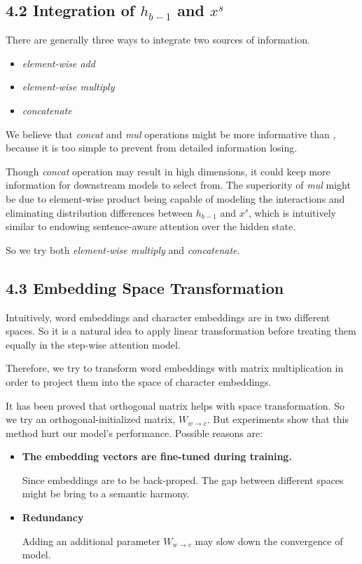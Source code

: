 \documentclass[letterpaper]{article} %
\begin{document}
\subsection{4.2 Integration of $h_{b-1}$ and $x^s$}
There are generally three ways to integrate two sources of information.
\begin{itemize}
    \item \textit{element-wise add}
    \item \textit{element-wise multiply}
    \item \textit{concatenate}
\end{itemize}


We believe that \textit{concat} and \textit{mul} operations might be more informative than , because it is too simple to prevent from detailed information losing. 

Though \textit{concat} operation may result in high dimensions, it could keep more information for downstream models to select from. The superiority of \textit{mul} might be due to element-wise product being capable of modeling the interactions and eliminating distribution differences between $h_{b-1}$ and $x^s$, which is intuitively similar to endowing sentence-aware attention over the hidden state. 

So we try both \textit{element-wise multiply} and \textit{concatenate}.

\subsection{4.3 Embedding Space Transformation}

Intuitively, word embeddings and character embeddings are in two different spaces. So it is a natural idea to apply linear transformation before treating them equally in the step-wise attention model.

Therefore, we try to transform word embeddings with matrix multiplication in order to project them into the space of character embeddings. 

It has been proved that orthogonal matrix helps with space transformation. So we try an orthogonal-initialized matrix, $W_{w\rightarrow c}$. But experiments show that this method hurt our model's performance. Possible reasons are:
\begin{itemize}
    \item \textbf{The embedding vectors are fine-tuned during training.}
    
    Since embeddings are to be back-proped. The gap between different spaces might be bring to a semantic harmony.
    
    \item \textbf{Redundancy}
    
    Adding an additional parameter $W_{w\rightarrow c}$ may slow down the convergence of model.
\end{itemize}
\end{document}

